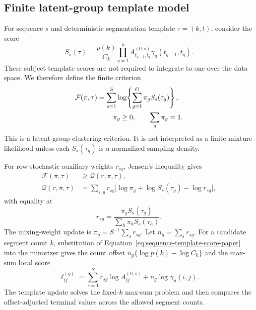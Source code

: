 \subsection{Finite latent-group template model}
For sequence $s$ and deterministic segmentation template $\tau=(k,t)$, consider the score
\begin{equation}
 S_s(\tau)=\frac{p(k)}{C_k}\prod_{q=1}^{k}
 A^{(0,s)}_{t_{q-1},t_q}\gamma_u(t_{q-1},t_q).
\label{eq:sequence-template-score-paper}
\end{equation}
These subject-template scores are not required to integrate to one over the data space. We therefore define the finite criterion
\begin{align}
\mathcal F(\pi,\tau)
&=\sum_{s=1}^{S}\log\!\left\{\sum_{g=1}^{G}\pi_gS_s(\tau_g)\right\},\nonumber\\
&\hspace{8mm}\pi_g\ge0,\qquad \sum_g\pi_g=1.
\label{eq:latent-group-objective}
\end{align}
This is a latent-group clustering criterion. It is not interpreted as a finite-mixture likelihood unless each $S_s(\tau_g)$ is a normalized sampling density.



For row-stochastic auxiliary weights $r_{sg}$, Jensen's inequality gives
\begin{align}
\mathcal F(\pi,\tau)&\ge\mathcal Q(r,\pi,\tau),\nonumber\\
\mathcal Q(r,\pi,\tau)
&=\sum_{s,g}r_{sg}\bigl[\log\pi_g+\log S_s(\tau_g)-\log r_{sg}\bigr],
\label{eq:latent-group-bound}
\end{align}
with equality at
\begin{equation}
 r_{sg}=\frac{\pi_gS_s(\tau_g)}{\sum_h\pi_hS_s(\tau_h)}.
\label{eq:auxiliary-weights}
\end{equation}
The mixing-weight update is $\pi_g=S^{-1}\sum_s r_{sg}$. Let $n_g=\sum_s r_{sg}$. For a candidate segment count $k$, substitution of Equation~\eqref{eq:sequence-template-score-paper} into the minorizer gives the count offset $n_g\{\log p(k)-\log C_k\}$ and the max-sum local score
\begin{equation}
\ell^{(g)}_{ij}=\sum_{s=1}^{S}r_{sg}\log A^{(0,s)}_{ij}
                  +n_g\log\gamma_u(i,j).
\label{eq:template-local-score}
\end{equation}
The template update solves the fixed-$k$ max-sum problem and then compares the offset-adjusted terminal values across the allowed segment counts.

